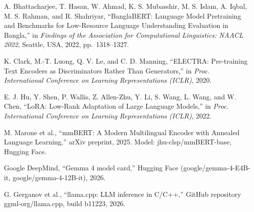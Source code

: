 %

A. Bhattacharjee, T. Hasan, W. Ahmad, K. S. Mubasshir, M. S. Islam, A. Iqbal,
M. S. Rahman, and R. Shahriyar, ``BanglaBERT: Language Model Pretraining and
Benchmarks for Low-Resource Language Understanding Evaluation in Bangla,'' in
\textit{Findings of the Association for Computational Linguistics: NAACL 2022},
Seattle, USA, 2022, pp.~1318--1327.

K. Clark, M.-T. Luong, Q. V. Le, and C. D. Manning, ``ELECTRA: Pre-training
Text Encoders as Discriminators Rather Than Generators,'' in \textit{Proc.
International Conference on Learning Representations (ICLR)}, 2020.

E. J. Hu, Y. Shen, P. Wallis, Z. Allen-Zhu, Y. Li, S. Wang, L. Wang, and
W. Chen, ``LoRA: Low-Rank Adaptation of Large Language Models,'' in \textit{Proc.
International Conference on Learning Representations (ICLR)}, 2022.

M. Marone et al., ``mmBERT: A Modern Multilingual Encoder with Annealed
Language Learning,'' arXiv preprint, 2025. Model: jhu-clsp/mmBERT-base,
Hugging Face.

Google DeepMind, ``Gemma 4 model card,'' Hugging Face (google/gemma-4-E4B-it,
google/gemma-4-12B-it), 2026.

G. Gerganov et al., ``llama.cpp: LLM inference in C/C++,'' GitHub repository
ggml-org/llama.cpp, build b11223, 2026.
